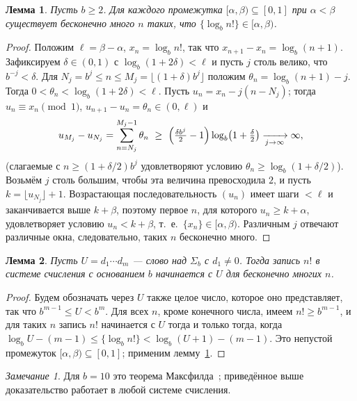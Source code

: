 \documentclass[a4paper,14pt]{extreport}
\theoremstyle{plain}
\newtheorem{lemma}{Лемма}[section]
\theoremstyle{definition}
\theoremstyle{remark}
\newtheorem{remark}{Замечание}
\begin{document}
\begin{lemma}\label{lem:logfact}
	Пусть $b\ge2$. Для каждого промежутка $[\alpha,\beta)\subseteq[0,1]$ при $\alpha<\beta$
	существует бесконечно много $n$ таких, что $\{\log_b n!\}\in[\alpha,\beta)$.
\end{lemma}
\begin{proof}
	Положим $\ell=\beta-\alpha$, $x_n=\log_b n!$, так что $x_{n+1}-x_n=\log_b(n+1)$.
	Зафиксируем $\delta\in(0,1)$ с $\log_b(1+2\delta)<\ell$ и пусть $j$ столь велико, что
	$b^{-j}<\delta$. Для $N_j=b^j\le n\le M_j=\lfloor(1+\delta)b^j\rfloor$ положим
	$\theta_n=\log_b(n+1)-j$. Тогда $0<\theta_n<\log_b(1+2\delta)<\ell$.
	Пусть $u_n=x_n-j(n-N_j)$; тогда $u_n\equiv x_n \pmod 1$, $u_{n+1}-u_n=\theta_n\in(0,\ell)$ и
	\begin{equation}
		u_{M_j}-u_{N_j}=\sum_{n=N_j}^{M_j-1}\theta_n\ \ge\ \Bigl(\tfrac{\delta b^j}{2}-1\Bigr)\log_b\bigl(1+\tfrac\delta2\bigr)\xrightarrow[j\to\infty]{}\infty ,
	\end{equation}
	(слагаемые с $n\ge(1+\delta/2)b^j$ удовлетворяют условию $\theta_n\ge\log_b(1+\delta/2)$).
	Возьмём $j$ столь большим, чтобы эта величина превосходила $2$, и пусть $k=\lfloor u_{N_j}\rfloor+1$.
	Возрастающая последовательность $(u_n)$ имеет шаги $<\ell$ и заканчивается выше $k+\beta$, поэтому первое $n$, для которого
	$u_n\ge k+\alpha$, удовлетворяет условию $u_n<k+\beta$, т.~е.\ $\{x_n\}\in[\alpha,\beta)$.
	Различным $j$ отвечают различные окна, следовательно, таких $n$ бесконечно много.
\end{proof}

\begin{lemma}\label{lem:lead}
	Пусть $U=d_1\cdots d_m$ --- слово над $\Sigma_b$ с $d_1\ne0$. Тогда запись $n!$ в системе счисления с основанием $b$ начинается с $U$ для бесконечно многих $n$.
\end{lemma}

\begin{proof}
	Будем обозначать через $U$ также целое число, которое оно представляет, так что $b^{m-1}\le U<b^m$. Для всех $n$, кроме конечного числа, имеем $n!\ge b^{m-1}$, и для таких $n$ запись $n!$ начинается с $U$ тогда и только тогда, когда
	$\log_bU-(m-1)\le\{\log_b n!\}<\log_b(U+1)-(m-1)$.
	Это непустой промежуток $[\alpha,\beta)\subseteq[0,1]$; применим лемму~\ref{lem:logfact}.
\end{proof}

\begin{remark}
	Для $b=10$ это теорема Максфилда~\cite{Maxfield}; приведённое выше доказательство работает в любой системе счисления.
\end{remark}
\end{document}
